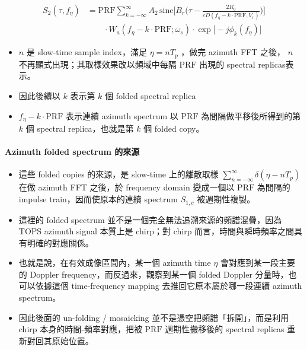 \documentclass[10pt]{article}
\providecommand{\tightlist}{%
  \setlength{\itemsep}{0pt}\setlength{\parskip}{0pt}}
\begin{document}
\begin{equation}
\begin{aligned}
S_2(\tau,f_\eta)
&=
\mathrm{PRF}\sum_{k=-\infty}^{\infty} A_2\,
\mathrm{sinc}\biggl[ B_r\biggl( \tau-\frac{2R_0}{cD(f_\eta-k\cdot\mathrm{PRF},V_r)} \biggr) \biggr]\\
&\qquad \cdot W_a(f_\eta-k\cdot\mathrm{PRF};\omega_s)
\cdot \exp\biggl[-j\phi_k(f_\eta)\biggr]
\end{aligned}
\end{equation}

\begin{itemize}
\tightlist
\item
  \(n\) 是 slow-time sample index，滿足 \(\eta=nT_p\) ，做完 azimuth FFT
  之後， \(n\) 不再顯式出現；其取樣效果改以頻域中每隔 \(\mathrm{PRF}\)
  出現的 spectral replicas表示。
\item
  因此後續以 \(k\) 表示第 \(k\) 個 folded spectral replica
\item
  \(f_\eta-k\cdot\mathrm{PRF}\) 表示連續 azimuth spectrum 以
  \(\mathrm{PRF}\) 為間隔做平移後所得到的第 \(k\) 個 spectral
  replica，也就是第 \(k\) 個 folded copy。
\end{itemize}

\hypertarget{azimuth-folded-spectrum-ux7684ux4f86ux6e90}{%
\paragraph{Azimuth folded spectrum
的來源}\label{azimuth-folded-spectrum-ux7684ux4f86ux6e90}}

\begin{itemize}
\tightlist
\item
  這些 folded copies 的來源，是 slow-time 上的離散取樣
  \(\sum_{n=-\infty}^{\infty}\delta(\eta-nT_p)\) 在做 azimuth FFT
  之後，於 frequency domain 變成一個以 \(\mathrm{PRF}\) 為間隔的 impulse
  train，因而使原本的連續 spectrum \(S_{1,c}\) 被週期性複製。
\item
  這裡的 folded spectrum 並不是一個完全無法追溯來源的頻譜混疊，因為 TOPS
  azimuth signal 本質上是 chirp；對 chirp
  而言，時間與瞬時頻率之間具有明確的對應關係。
\item
  也就是說，在有效成像區間內，某一個 azimuth time \(\eta\)
  會對應到某一段主要的 Doppler frequency，而反過來，觀察到某一個 folded
  Doppler 分量時，也可以依據這個 time-frequency mapping
  去推回它原本屬於哪一段連續 azimuth spectrum。
\item
  因此後面的 un-folding / mosaicking 並不是憑空把頻譜「拆開」，而是利用
  chirp 本身的時間-頻率對應，把被 \(\mathrm{PRF}\) 週期性搬移後的
  spectral replicas 重新對回其原始位置。
\end{itemize}
\end{document}
